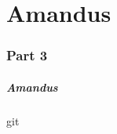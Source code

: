 \part{Amandus}

\section*{Part 3}
\begin{frame}
  \frametitle{Amandus}
  \tableofcontents[hideallsubsections]
\end{frame}


 {git}


% 
% 


% 

%


